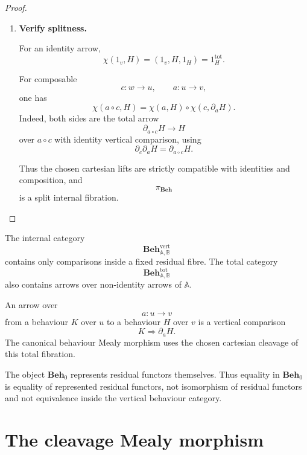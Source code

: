 \begin{proof}
\begin{enumerate}
        \item \textbf{Verify splitness.}

        For an identity arrow,
        \[
            \chi(1_v,H)
            =
            (1_v,H,1_H)
            =
            1_H^{\mathrm{tot}}.
        \]

        For composable
        \[
            c:w\to u,
            \qquad
            a:u\to v,
        \]
        one has
        \[
            \chi(a\circ c,H)
            =
            \chi(a,H)
            \circ
            \chi(c,\partial_aH).
        \]
        Indeed, both sides are the total arrow
        \[
            \partial_{a\circ c}H\to H
        \]
        over \(a\circ c\) with identity vertical comparison, using
        \[
            \partial_c\partial_aH
            =
            \partial_{a\circ c}H.
        \]

        Thus the chosen cartesian lifts are strictly compatible with
        identities and composition, and
        \[
            \pi_{\mathbf{Beh}}
        \]
        is a split internal fibration.
    \end{enumerate}
\end{proof}

\begin{remark}
\label{rem:vertical-not-total-fibration}
    The internal category
    \[
        \mathbf{Beh}^{\mathrm{vert}}_{\mathbb A,\mathbb B}
    \]
    contains only comparisons inside a fixed residual fibre. The total
    category
    \[
        \mathbf{Beh}^{\mathrm{tot}}_{\mathbb A,\mathbb B}
    \]
    also contains arrows over non-identity arrows of \(\mathbb A\).

    An arrow over
    \[
        a:u\to v
    \]
    from a behaviour \(K\) over \(u\) to a behaviour \(H\) over \(v\) is a
    vertical comparison
    \[
        K\Rightarrow\partial_aH.
    \]
    The canonical behaviour Mealy morphism uses the chosen cartesian
    cleavage of this total fibration.
\end{remark}

\begin{remark}
\label{rem:equality-of-behaviours}
    The object \(\mathbf{Beh}_0\) represents residual functors themselves. Thus equality in \(\mathbf{Beh}_0\) is equality of represented residual functors, not isomorphism of residual functors and not equivalence inside the vertical behaviour category.
\end{remark}

\section{The cleavage Mealy morphism}
\label{sec:cleavage-mealy-morphism}

